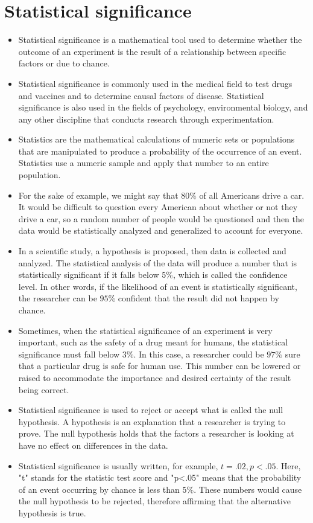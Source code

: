 \section{Statistical significance}
\begin{itemize}
\item Statistical significance is a mathematical tool used to determine whether the outcome of an experiment is the result of a relationship between specific factors or due to chance. 
\item Statistical significance is commonly used in the medical field to test drugs and vaccines and to determine causal factors of disease. Statistical significance is also used in the fields of psychology, environmental biology, and any other discipline that conducts research through experimentation.

\item Statistics are the mathematical calculations of numeric sets or populations that are manipulated to produce a probability of the occurrence of an event. Statistics use a numeric sample and apply that number to an entire population. 
\item For the sake of example, we might say that $80\%$ of all Americans drive a car. It would be difficult to question every American about whether or not they drive a car, so a random number of people would be questioned and then the data would be statistically analyzed and generalized to account for everyone.

\item In a scientific study, a hypothesis is proposed, then data is collected and analyzed. The statistical analysis of the data will produce a number that is statistically significant if it falls below $5\%$, which is called the confidence level. In other words, if the likelihood of an event is statistically significant, the researcher can be $95\%$ confident that the result did not happen by chance.

\item Sometimes, when the statistical significance of an experiment is very important, such as the safety of a drug meant for humans, the statistical significance must fall below $3\%$. In this case, a researcher could be $97\%$ sure that a particular drug is safe for human use. This number can be lowered or raised to accommodate the importance and desired certainty of the result being correct.
\item Statistical significance is used to reject or accept what is called the null hypothesis. A hypothesis is an explanation that a researcher is trying to prove. The null hypothesis holds that the factors a researcher is looking at have no effect on differences in the data. \item Statistical significance is usually written, for example, $t=.02, p<.05$. Here, "t" stands for the statistic test score and "p<.05" means that the probability of an event occurring by chance is less than $5\%$. These numbers would cause the null hypothesis to be rejected, therefore affirming that the alternative hypothesis is true.


\end{itemize}
